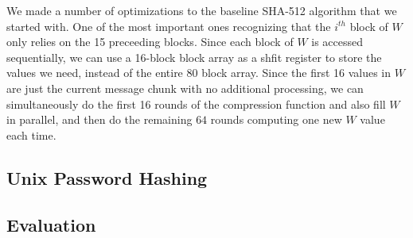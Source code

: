 We made a number of optimizations to the baseline SHA-512 algorithm that we started with. One of the
most important ones recognizing that the $i^{th}$ block of $W$ only relies on the 15 preceeding blocks.
Since each block of $W$ is accessed sequentially, we can use a 16-block block array as a shfit register
to store the values we need, instead of the entire 80 block array. Since the first 16 values in $W$ are
just the current message chunk with no additional processing, we can simultaneously do the first 16
rounds of the compression function and also fill $W$ in parallel, and then do the remaining $64$ rounds
computing one new $W$ value each time.

\subsection{Unix Password Hashing}

\subsection{Evaluation}
